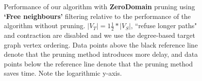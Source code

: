 \begin{figure}
\begin{subfigure} {0.5\linewidth}

\end{subfigure}

\caption{Performance of our algorithm with \textbf{ZeroDomain} pruning using \textbf{`Free neighbours'} filtering relative to the performance of the algorithm without pruning. $|V_T|=1\frac{1}{2}*|V_S|$, ``refuse longer paths" and contraction are disabled and we use the degree-based target graph vertex ordering. Data points above the black reference line denote that the pruning method introduces more delay, and data points below the reference line denote that the pruning method saves time. Note the logarithmic y-axis.}	
\label{fig:zerodomainunmatched}
\end{figure}

